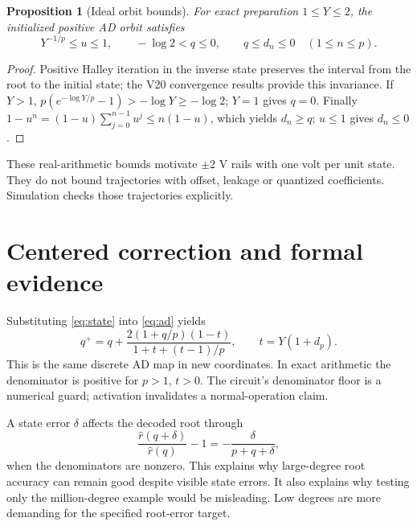 \documentclass[11pt,a4paper]{article}
\newtheorem{proposition}{Proposition}
\begin{document}
\begin{proposition}[Ideal orbit bounds]
For exact preparation $1\le Y\le2$, the initialized positive AD orbit satisfies
\[
 Y^{-1/p}\le u\le1,\qquad -\log2<q\le0,\qquad q\le d_n\le0\quad(1\le n\le p).
\]
\end{proposition}
\begin{proof}
Positive Halley iteration in the inverse state preserves the interval from the root to the initial state; the V20 convergence results provide this invariance. If $Y>1$, $p(e^{-\log Y/p}-1)>-\log Y\ge-\log2$; $Y=1$ gives $q=0$. Finally $1-u^n=(1-u)\sum_{j=0}^{n-1}u^j\le n(1-u)$, which yields $d_n\ge q$; $u\le1$ gives $d_n\le0$.
\end{proof}
These real-arithmetic bounds motivate $\pm2$ V rails with one volt per unit state. They do not bound trajectories with offset, leakage or quantized coefficients. Simulation checks those trajectories explicitly.
\clearpage

\section{Centered correction and formal evidence}
Substituting \eqref{eq:state} into \eqref{eq:ad} yields
\begin{equation}
 \boxed{q^+=q+\frac{2(1+q/p)(1-t)}{1+t+(t-1)/p},\qquad t=Y(1+d_p).}\label{eq:centered}
\end{equation}
This is the same discrete AD map in new coordinates. In exact arithmetic the denominator is positive for $p>1$, $t>0$. The circuit's denominator floor is a numerical guard; activation invalidates a normal-operation claim.

A state error $\delta$ affects the decoded root through
\begin{equation}
 \frac{\widehat r(q+\delta)}{\widehat r(q)}-1
 =-\frac{\delta}{p+q+\delta},\label{eq:error}
\end{equation}
when the denominators are nonzero. This explains why large-degree root accuracy can remain good despite visible state errors. It also explains why testing only the million-degree example would be misleading. Low degrees are more demanding for the specified root-error target.
\end{document}
